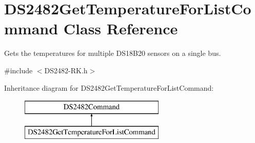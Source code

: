 \hypertarget{class_d_s2482_get_temperature_for_list_command}{}\section{D\+S2482\+Get\+Temperature\+For\+List\+Command Class Reference}
\label{class_d_s2482_get_temperature_for_list_command}


Gets the temperatures for multiple D\+S18\+B20 sensors on a single bus.  




{\ttfamily \#include $<$D\+S2482-\/\+R\+K.\+h$>$}

Inheritance diagram for D\+S2482\+Get\+Temperature\+For\+List\+Command\+:\begin{figure}[H]
\begin{center}
\leavevmode
\includegraphics[height=2.000000cm]{class_d_s2482_get_temperature_for_list_command}
\end{center}
\end{figure}
